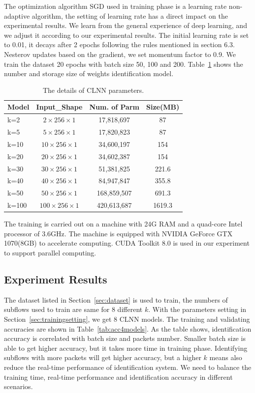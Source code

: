 \documentclass[conference]{IEEEtran}
\begin{document}
The optimization algorithm SGD used in training phase is a learning rate non-adaptive algorithm, the setting of learning rate has a direct impact on the experimental results. We learn from the general experience of deep learning, and we adjust it according to our experimental results. The initial learning rate is set to 0.01, it decays after 2 epochs following the rules mentioned in section 6.3. Nesterov updates based on the gradient, we set momentum factor to 0.9. We train the dataset 20 epochs with batch size 50, 100 and 200. Table~\ref{tab:params} shows the number and storage size of weights identification model.
\begin{table}
  \caption{The details of CLNN parameters.}
  \label{tab:params}
  \centering
  \begin{tabular}{l c c c}
    \hline
    \textbf{Model} & \textbf{Input\_Shape} & \textbf{Num. of Parm}&\textbf{Size(MB)}\\
    \hline
    k=2      & ${2 \times 256 \times 1}$  & 17,818,697  &87  \\
    k=5      & ${5 \times 256 \times 1}$  & 17,820,823  &87  \\
    k=10      & ${10 \times 256 \times 1}$  & 34,600,197  &154  \\
    k=20      & ${20 \times 256 \times 1}$  & 34,602,387  &154 \\
    k=30     & ${30 \times 256 \times 1}$  & 51,381,825  &221.6  \\
    k=40     & ${40 \times 256 \times 1}$  & 84,947,847  &355.8 \\
    k=50     & ${50 \times 256 \times 1}$  & 168,859,507  &691.3  \\
    k=100    & ${100 \times 256 \times 1}$  & 420,613,687  &1619.3  \\
    \hline
  \end{tabular}
\end{table}

The training is carried out on a machine with 24G RAM and a quad-core Intel processor of 3.6GHz. The machine is equipped with NVIDIA GeForce GTX 1070(8GB) to accelerate computing. CUDA Toolkit 8.0 is used in our experiment to support parallel computing.


\subsection{Experiment Results}
\label{sec:experimentresults}
The dataset listed in Section~\ref{sec:dataset} is used to train, the numbers of subflows used to train are same for 8 different $k$. With the parameters setting in Section~\ref{sec:trainingsetting}, we get 8 CLNN models. The training and validating accuracies are shown in Table~\ref{tab:acc4models}. As the table shows, identification accuracy is correlated with batch size and packets number. Smaller batch size is able to get higher accuracy, but it takes more time in training phase. Identifying subflows with more packets will get higher accuracy, but a higher $k$ means also reduce the real-time performance of identification system. We need to balance the training time, real-time performance and identification accuracy in different scenarios. 
\end{document}

